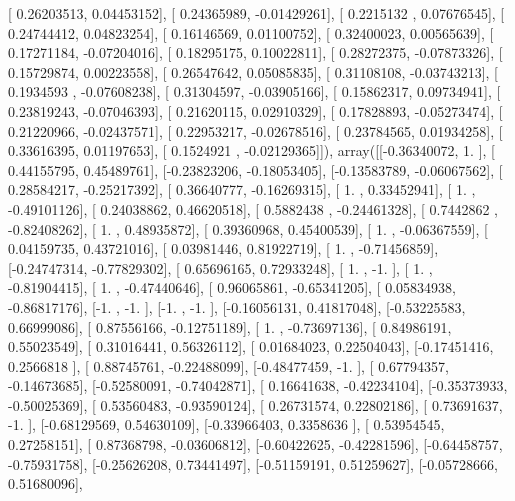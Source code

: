 \documentclass{article}
\begin{document}
       [ 0.26203513,  0.04453152],
       [ 0.24365989, -0.01429261],
       [ 0.2215132 ,  0.07676545],
       [ 0.24744412,  0.04823254],
       [ 0.16146569,  0.01100752],
       [ 0.32400023,  0.00565639],
       [ 0.17271184, -0.07204016],
       [ 0.18295175,  0.10022811],
       [ 0.28272375, -0.07873326],
       [ 0.15729874,  0.00223558],
       [ 0.26547642,  0.05085835],
       [ 0.31108108, -0.03743213],
       [ 0.1934593 , -0.07608238],
       [ 0.31304597, -0.03905166],
       [ 0.15862317,  0.09734941],
       [ 0.23819243, -0.07046393],
       [ 0.21620115,  0.02910329],
       [ 0.17828893, -0.05273474],
       [ 0.21220966, -0.02437571],
       [ 0.22953217, -0.02678516],
       [ 0.23784565,  0.01934258],
       [ 0.33616395,  0.01197653],
       [ 0.1524921 , -0.02129365]]), array([[-0.36340072,  1.        ],
       [ 0.44155795,  0.45489761],
       [-0.23823206, -0.18053405],
       [-0.13583789, -0.06067562],
       [ 0.28584217, -0.25217392],
       [ 0.36640777, -0.16269315],
       [ 1.        ,  0.33452941],
       [ 1.        , -0.49101126],
       [ 0.24038862,  0.46620518],
       [ 0.5882438 , -0.24461328],
       [ 0.7442862 , -0.82408262],
       [ 1.        ,  0.48935872],
       [ 0.39360968,  0.45400539],
       [ 1.        , -0.06367559],
       [ 0.04159735,  0.43721016],
       [ 0.03981446,  0.81922719],
       [ 1.        , -0.71456859],
       [-0.24747314, -0.77829302],
       [ 0.65696165,  0.72933248],
       [ 1.        , -1.        ],
       [ 1.        , -0.81904415],
       [ 1.        , -0.47440646],
       [ 0.96065861, -0.65341205],
       [ 0.05834938, -0.86817176],
       [-1.        , -1.        ],
       [-1.        , -1.        ],
       [-0.16056131,  0.41817048],
       [-0.53225583,  0.66999086],
       [ 0.87556166, -0.12751189],
       [ 1.        , -0.73697136],
       [ 0.84986191,  0.55023549],
       [ 0.31016441,  0.56326112],
       [ 0.01684023,  0.22504043],
       [-0.17451416,  0.2566818 ],
       [ 0.88745761, -0.22488099],
       [-0.48477459, -1.        ],
       [ 0.67794357, -0.14673685],
       [-0.52580091, -0.74042871],
       [ 0.16641638, -0.42234104],
       [-0.35373933, -0.50025369],
       [ 0.53560483, -0.93590124],
       [ 0.26731574,  0.22802186],
       [ 0.73691637, -1.        ],
       [-0.68129569,  0.54630109],
       [-0.33966403,  0.3358636 ],
       [ 0.53954545,  0.27258151],
       [ 0.87368798, -0.03606812],
       [-0.60422625, -0.42281596],
       [-0.64458757, -0.75931758],
       [-0.25626208,  0.73441497],
       [-0.51159191,  0.51259627],
       [-0.05728666,  0.51680096],
\end{document}
